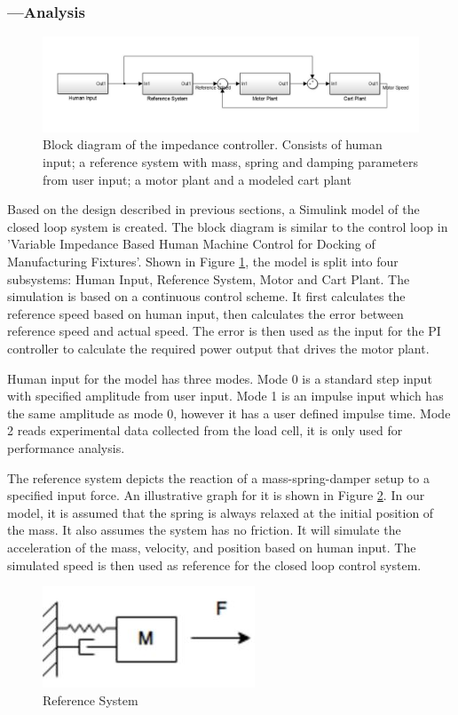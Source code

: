 \subsubsection*{ ---Analysis}
\begin{figure}[ht]
	\centering
	\includegraphics[width=1\linewidth]{Images/ControlLoop}
	\caption{Block diagram of the impedance controller. Consists of human input; a reference system with mass, spring and damping parameters from user input; a motor plant and a modeled cart plant}
	\label{fig:ControlLoop}
\end{figure}
Based on the design described in previous sections, a Simulink model of the closed loop system is created. The block diagram is similar to the control loop in 'Variable Impedance Based Human Machine Control for Docking of Manufacturing Fixtures'\cite{toni}. Shown in Figure \ref{fig:ControlLoop}, the model is split into four subsystems: Human Input, Reference System, Motor and Cart Plant. The simulation is based on a continuous control scheme. It first calculates the reference speed based on human input, then calculates the error between reference speed and actual speed. The error is then used as the input for the PI controller to calculate the required power output that drives the motor plant.

Human input for the model has three modes. Mode 0 is a standard step input with specified amplitude from user input. Mode 1 is an impulse input which has the same amplitude as mode 0, however it has a user defined impulse time. Mode 2 reads experimental data collected from the load cell, it is only used for performance analysis.

The reference system depicts the reaction of a mass-spring-damper setup to a specified input force. An illustrative graph for it is shown in Figure \ref{MSB}. In our model, it is assumed that the spring is always relaxed at the initial position of the mass. It also assumes the system has no friction. It will simulate the acceleration of the mass, velocity, and position based on human input. The simulated speed is then used as reference for the closed loop control system.

\begin{figure}[h]
	\centering
	\includegraphics[width=0.5\linewidth]{Images/MSB}
	\caption{Reference System}
	\label{MSB}
\end{figure}

